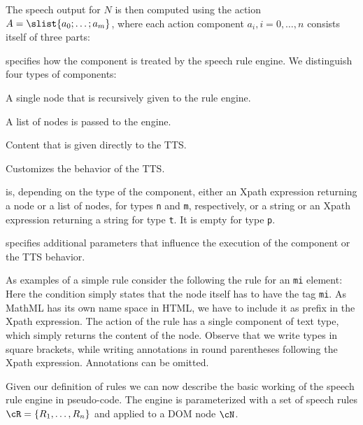 \documentclass{sig-alternate}
\begin{document}
The speech output for $N$ is then computed using the action $A =
\slist{a_0;\ldots;a_m}$, where each action component $a_i, i=0,\ldots,n$
consists itself of three parts: 
\begin{description}\itemsep-1.5pt
\item[Type] specifies how the component is treated by the speech rule engine. We
  distinguish four types of components:
  \begin{description}\itemsep-1.5pt
  \item[Node (denoted \texttt{n})] A single node that is recursively given to
    the rule engine.
  \item[Multi (\texttt{m})] A list of nodes is passed to the engine.
  \item[Text (\texttt{t})] Content that is given directly to the TTS.
  \item[Personality (\texttt{p})] Customizes the behavior of the TTS.
  \end{description}
\item[Content] is, depending on the type of the component, either an Xpath
  expression returning a node or a list of nodes, for types \texttt{n} and
  \texttt{m}, respectively, or a string or an Xpath expression returning a
  string for type \texttt{t}.  It is empty for type \texttt{p}.
\item[Annotation] specifies additional parameters that influence the execution
  of the component or the TTS behavior.
\end{description}

As examples of a simple rule consider the following the rule for an \texttt{mi}
element:  Here the condition simply states
that the node itself has to have the tag \texttt{mi}. As MathML has its own name
space in HTML, we have to include it as prefix in the Xpath expression. The
action of the rule has a single component of text type, which simply returns the
content of the node. Observe that we write types in square brackets, while
writing annotations in round parentheses following the Xpath
expression. Annotations can be omitted.

Given our definition of rules we can now describe the basic working of the
speech rule engine in pseudo-code. The engine is parameterized with a set of
speech rules ${\cR}={\{R_1,\ldots,R_n\}}$ and applied to a DOM node $\cN$.
\end{document}
